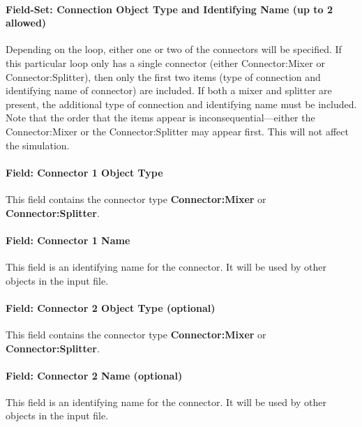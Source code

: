 \paragraph{Field-Set: Connection Object Type and Identifying Name (up to 2 allowed)}\label{field-set-connection-object-type-and-identifying-name-up-to-2-allowed}

Depending on the loop, either one or two of the connectors will be specified. If this particular loop only has a single connector (either Connector:Mixer or Connector:Splitter), then only the first two items (type of connection and identifying name of connector) are included. If both a mixer and splitter are present, the additional type of connection and identifying name must be included. Note that the order that the items appear is inconsequential---either the Connector:Mixer or the Connector:Splitter may appear first. This will not affect the simulation.

\paragraph{Field: Connector 1 Object Type}\label{field-connector-1-object-type}

This field contains the connector type \textbf{Connector:Mixer} or \textbf{Connector:Splitter}.

\paragraph{Field: Connector 1 Name}\label{field-connector-1-name}

This field is an identifying name for the connector. It will be used by other objects in the input file.

\paragraph{Field: Connector 2 Object Type (optional)}\label{field-connector-2-object-type-optional}

This field contains the connector type \textbf{Connector:Mixer} or \textbf{Connector:Splitter}.

\paragraph{Field: Connector 2 Name (optional)}\label{field-connector-2-name-optional}

This field is an identifying name for the connector. It will be used by other objects in the input file.

